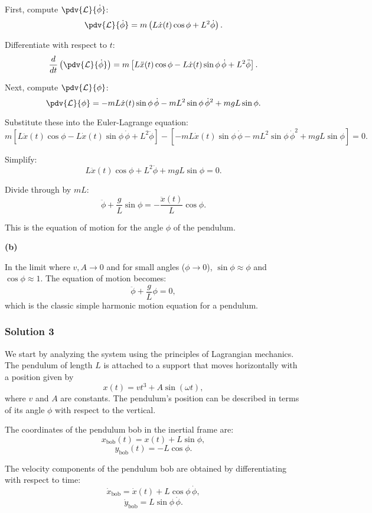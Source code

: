 \documentclass{article}
\begin{document}
First, compute $\pdv{\mathcal{L}}{\dot{\phi}}$:
\[
\pdv{\mathcal{L}}{\dot{\phi}} = m\left(L\dot{x}(t)\cos\phi + L^2\dot{\phi}\right).
\]

Differentiate with respect to $t$:
\[
\frac{d}{dt}\left(\pdv{\mathcal{L}}{\dot{\phi}}\right) = m\left[L\ddot{x}(t)\cos\phi - L\dot{x}(t)\sin\phi\,\dot{\phi} + L^2\ddot{\phi}\right].
\]

Next, compute $\pdv{\mathcal{L}}{\phi}$:
\[
\pdv{\mathcal{L}}{\phi} = -mL\dot{x}(t)\sin\phi\,\dot{\phi} - mL^2\sin\phi\,\dot{\phi}^2 + mgL\sin\phi.
\]

Substitute these into the Euler-Lagrange equation:
\[
m\left[L\ddot{x}(t)\cos\phi - L\dot{x}(t)\sin\phi\,\dot{\phi} + L^2\ddot{\phi}\right] - \left[-mL\dot{x}(t)\sin\phi\,\dot{\phi} - mL^2\sin\phi\,\dot{\phi}^2 + mgL\sin\phi\right] = 0.
\]

Simplify:
\[
L\ddot{x}(t)\cos\phi + L^2\ddot{\phi} + mgL\sin\phi = 0.
\]

Divide through by $mL$:
\[
\ddot{\phi} + \frac{g}{L}\sin\phi = -\frac{\ddot{x}(t)}{L}\cos\phi.
\]

This is the equation of motion for the angle $\phi$ of the pendulum.

\textbf{(b)}

In the limit where $v, A \to 0$ and for small angles ($\phi \to 0$), $\sin\phi \approx \phi$ and $\cos\phi \approx 1$. The equation of motion becomes:
\[
\ddot{\phi} + \frac{g}{L}\phi = 0,
\]
which is the classic simple harmonic motion equation for a pendulum.


\subsubsection{Solution 3}
We start by analyzing the system using the principles of Lagrangian mechanics. The pendulum of length $L$ is attached to a support that moves horizontally with a position given by 
\[
x(t) = vt^3 + A\sin(\omega t),
\]
where $v$ and $A$ are constants. The pendulum's position can be described in terms of its angle $\phi$ with respect to the vertical.

The coordinates of the pendulum bob in the inertial frame are:
\[
x_\text{bob}(t) = x(t) + L\sin\phi,
\]
\[
y_\text{bob}(t) = -L\cos\phi.
\]

The velocity components of the pendulum bob are obtained by differentiating with respect to time:
\[
\dot{x}_\text{bob} = \dot{x}(t) + L\cos\phi \, \dot{\phi},
\]
\[
\dot{y}_\text{bob} = L\sin\phi \, \dot{\phi}.
\]
\end{document}
